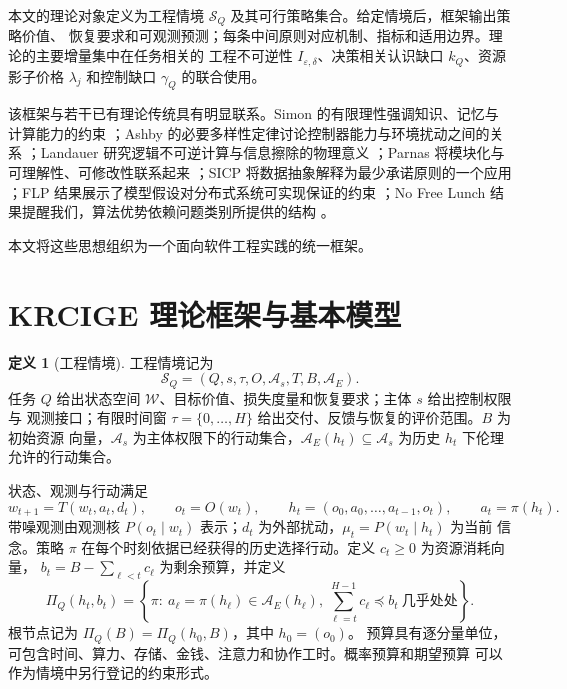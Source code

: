 \documentclass[11pt,a4paper]{ctexart}
\numberwithin{equation}{section}
\theoremstyle{definition}
\newtheorem{definition}{定义}[section]
\theoremstyle{plain}
\begin{document}
本文的理论对象定义为工程情境 $\mathcal{S}_Q$ 及其可行策略集合。给定情境后，框架输出策略价值、
恢复要求和可观测预测；每条中间原则对应机制、指标和适用边界。理论的主要增量集中在任务相关的
工程不可逆性 $I_{\varepsilon,\delta}$、决策相关认识缺口 $k_Q$、资源影子价格 $\lambda_j$ 和控制缺口
$\gamma_Q$ 的联合使用。

该框架与若干已有理论传统具有明显联系。Simon 的有限理性强调知识、记忆与计算能力的约束 \cite{simon1978}；Ashby 的必要多样性定律讨论控制器能力与环境扰动之间的关系 \cite{ashby1956}；Landauer 研究逻辑不可逆计算与信息擦除的物理意义 \cite{landauer1961}；Parnas 将模块化与可理解性、可修改性联系起来 \cite{parnas1972}；SICP 将数据抽象解释为最少承诺原则的一个应用 \cite{sicp1996}；FLP 结果展示了模型假设对分布式系统可实现保证的约束 \cite{flp1985}；No Free Lunch 结果提醒我们，算法优势依赖问题类别所提供的结构 \cite{wolpert1997}。

本文将这些思想组织为一个面向软件工程实践的统一框架。

\section{KRCIGE 理论框架与基本模型}
\label{sec:model}

\begin{definition}[工程情境]
工程情境记为
\[
\mathcal{S}_Q=(Q,s,\tau,O,\mathcal{A}_s,T,B,\mathcal{A}_E).
\]
任务 $Q$ 给出状态空间 $\mathcal{W}$、目标价值、损失度量和恢复要求；主体 $s$ 给出控制权限与
观测接口；有限时间窗 $\tau=\{0,\ldots,H\}$ 给出交付、反馈与恢复的评价范围。$B$ 为初始资源
向量，$\mathcal{A}_s$ 为主体权限下的行动集合，$\mathcal{A}_E(h_t)\subseteq\mathcal{A}_s$ 为历史
$h_t$ 下伦理允许的行动集合。
\end{definition}

状态、观测与行动满足
\begin{equation}
w_{t+1}=T(w_t,a_t,d_t),\qquad o_t=O(w_t),\qquad
h_t=(o_0,a_0,\ldots,a_{t-1},o_t),\qquad a_t=\pi(h_t).
\label{eq:dynamics}
\end{equation}
带噪观测由观测核 $P(o_t\mid w_t)$ 表示；$d_t$ 为外部扰动，$\mu_t=P(w_t\mid h_t)$ 为当前
信念。策略 $\pi$ 在每个时刻依据已经获得的历史选择行动。定义 $c_t\ge0$ 为资源消耗向量，
$b_t=B-\sum_{\ell<t}c_\ell$ 为剩余预算，并定义
\begin{equation}
\Pi_Q(h_t,b_t)=\left\{\pi:\ a_\ell=\pi(h_\ell)\in\mathcal{A}_E(h_\ell),\
\textstyle\sum_{\ell=t}^{H-1}c_\ell\preceq b_t\ \text{几乎处处}\right\}.
\label{eq:feasible-policy}
\end{equation}
根节点记为 $\Pi_Q(B)=\Pi_Q(h_0,B)$，其中 $h_0=(o_0)$。
预算具有逐分量单位，可包含时间、算力、存储、金钱、注意力和协作工时。概率预算和期望预算
可以作为情境中另行登记的约束形式。
\end{document}
